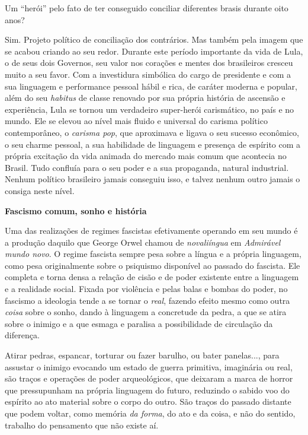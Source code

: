 Um ``herói'' pelo fato de ter conseguido conciliar diferentes brasis
durante oito anos?

Sim. Projeto político de conciliação dos contrários. Mas também pela
imagem que se acabou criando ao seu redor. Durante este período
importante da vida de Lula, o de seus dois Governos, seu valor nos
corações e mentes dos brasileiros cresceu muito a seu favor. Com a
investidura simbólica do cargo de presidente e com a sua linguagem e
performance pessoal hábil e rica, de caráter moderna e popular, além do
seu \emph{habitus} de classe renovado por sua própria história de
ascensão e experiência, Lula se tornou um verdadeiro super-herói
carismático, no país e no mundo. Ele se elevou ao nível mais fluido e
universal do carisma político contemporâneo, o \emph{carisma pop}, que
aproximava e ligava o seu sucesso econômico, o seu charme pessoal, a sua
habilidade de linguagem e presença de espírito com a própria excitação
da vida animada do mercado mais comum que acontecia no Brasil. Tudo
confluía para o seu poder e a sua propaganda, natural industrial. Nenhum
político brasileiro jamais conseguiu isso, e talvez nenhum outro jamais
o consiga neste nível.

\textbf{Fascismo comum, sonho e história}

Uma das realizações de regimes fascistas efetivamente operando em seu
mundo é a produção daquilo que George Orwel chamou de \emph{novaliíngua}
em \emph{Admirável mundo novo}. O regime fascista sempre pesa sobre a
língua e a própria linguagem, como pesa originalmente sobre o psiquismo
disponível ao passado do fascista. Ele completa e torna densa a relação
de cisão e de poder existente entre a linguagem e a realidade social.
Fixada por violência e pelas balas e bombas do poder, no fascismo a
ideologia tende a se tornar o \emph{real}, fazendo efeito mesmo como
outra \emph{coisa} sobre o sonho, dando à linguagem a concretude da
pedra, a que se atira sobre o inimigo e a que esmaga e paralisa a
possibilidade de circulação da diferença.

Atirar pedras, espancar, torturar ou fazer barulho, ou bater panelas...,
para assustar o inimigo evocando um estado de guerra primitiva,
imaginária ou real, são traços e operações de poder arqueológicos, que
deixaram a marca de horror que pressupunham na própria linguagem do
futuro, reduzindo o sabido voo do espírito ao ato material sobre o corpo
do outro. São traços do passado distante que podem voltar, como memória
\emph{da forma}, do ato e da coisa, e não do sentido, trabalho do
pensamento que não existe aí.

